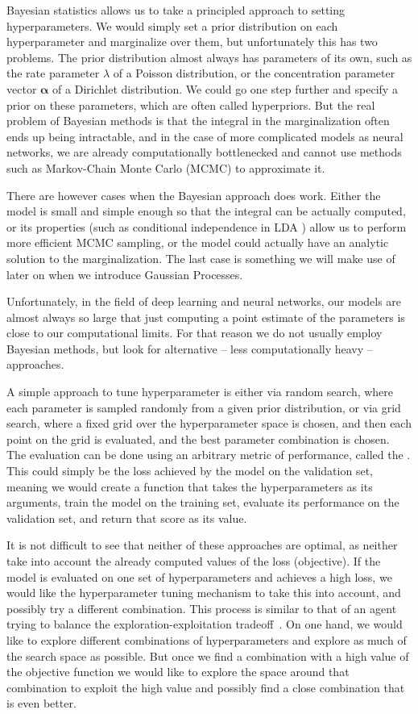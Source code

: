 Bayesian statistics allows us to take a principled approach to setting
hyperparameters. We would simply set a prior distribution on each
hyperparameter and marginalize over them, but unfortunately this has two
problems. The prior distribution almost always has parameters of its own, such
as the rate parameter $\lambda$ of a Poisson distribution, or the concentration
parameter vector ${\bm \alpha}$ of a Dirichlet distribution. We could go one
step further and specify a prior on these parameters, which are often called
hyperpriors.  But the real problem of Bayesian methods is that the integral in
the marginalization often ends up being intractable, and in the case of more
complicated models as neural networks, we are already computationally
bottlenecked and cannot use methods such as Markov-Chain Monte Carlo (MCMC) to
approximate it.

There are however cases when the Bayesian approach does work. Either the model
is small and simple enough so that the integral can be actually computed, or
its properties (such as conditional independence in LDA
\citep{lda-blei2003latent}) allow us to perform more efficient MCMC sampling,
or the model could actually have an analytic solution to the marginalization.
The last case is something we will make use of later on when we introduce
Gaussian Processes.

Unfortunately, in the field of deep learning \citep{dlbook} and neural
networks, our models are almost always so large that just computing a point
estimate of the parameters is close to our computational limits. For that
reason we do not usually employ Bayesian methods, but look for alternative --
less computationally heavy -- approaches.

A simple approach to tune hyperparameter is either via random search, where
each parameter is sampled randomly from a given prior distribution, or via grid
search, where a fixed grid over the hyperparameter space is chosen, and then
each point on the grid is evaluated, and the best parameter combination is
chosen. The evaluation can be done using an arbitrary metric of performance,
called the . This could simply be the loss
achieved by the model on the validation set, meaning we would create a function that takes the hyperparameters as its arguments, train the model on the training set, evaluate its performance on the validation set, and return that score as its value.

It is not difficult to see that neither of these approaches are optimal, as neither
take into account the already computed values of the loss (objective). If the model
is evaluated on one set of hyperparameters and achieves a high loss, we would
like the hyperparameter tuning mechanism to take this into account, and
possibly try a different combination. This process is similar to that of an
agent trying to balance the exploration-exploitation
tradeoff~\citep{russell2016artificial}.  On one hand, we would like to explore
different combinations of hyperparameters and explore as much of the search
space as possible.  But once we find a combination with a high value of the
objective function we would like to explore the space around that combination
to exploit the high value and possibly find a close combination that is even
better.

